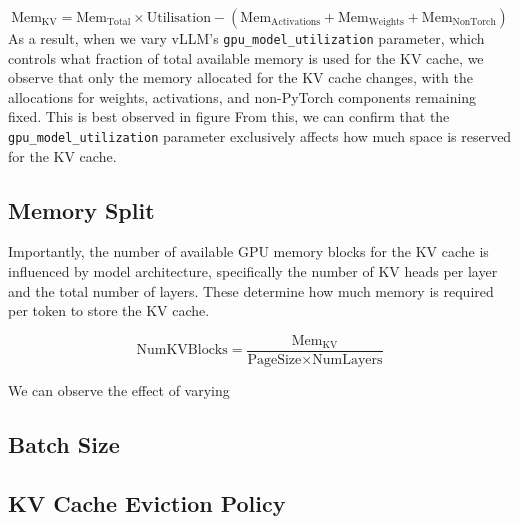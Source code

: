 \documentclass[12pt,twoside]{report}
\begin{document}
\begin{equation*}
  \text{Mem}_{\text{KV}} = \text{Mem}_{\text{Total}} \times \text{Utilisation} - (\text{Mem}_{\text{Activations}} + \text{Mem}_{\text{Weights}} + \text{Mem}_{\text{NonTorch}})
\end{equation*}
As a result, when we vary vLLM’s \texttt{gpu\_model\_utilization} parameter, which controls what fraction of total available memory is used for the KV cache, we observe that only the memory allocated for the KV cache changes, with the allocations for weights, activations, and non-PyTorch components remaining fixed.
This is best observed in figure %
From this, we can confirm that the \texttt{gpu\_model\_utilization} parameter exclusively affects how much space is reserved for the KV cache.

\subsection{Memory Split}
\begin{comment}
  - i think it would be cool if i could explain where the 0.3 thing comes from in terms of theory/number of blocks
  - speak about how block size varies
    - what determines block size
\end{comment}

Importantly, the number of available GPU memory blocks for the KV cache is influenced by model architecture, specifically the number of KV heads per layer and the total number of layers. 
These determine how much memory is required per token to store the KV cache.

\begin{equation*}
  \text{NumKVBlocks} = \frac{\text{Mem}_{\text{KV}}}{\text{PageSize} \times \text{NumLayers}}
\end{equation*}

We can observe the effect of varying 




\subsection{Batch Size}
\begin{comment}
  - 
\end{comment}

\subsection{KV Cache Eviction Policy}
\begin{comment}
  - explain vllm kv cache eviction policy
  - supporting plot
\end{comment}
\end{document}
